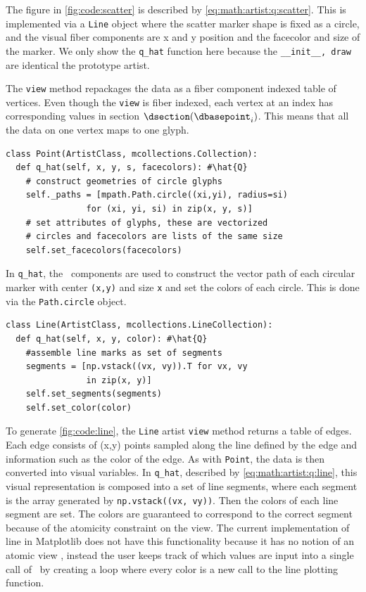 \documentclass[../main.tex]{subfiles}
\begin{document}
The figure in \autoref{fig:code:scatter} is described by \autoref{eq:math:artist:q:scatter}. This is implemented via a \texttt{Line} object where the scatter marker shape is fixed as a circle, and the visual fiber components are x and y position and the facecolor and size of the marker. We only show the \texttt{q_hat} function here because the \texttt{__init__, draw} are identical the prototype artist. 

The \texttt{view} method repackages the data as a fiber component indexed table of vertices. Even though the \texttt{view} is fiber indexed, each vertex at an index \dbasepoint has corresponding values in section $\dsection(\dbasepoint_{i})$. This means that all the data on one vertex maps to one glyph.
\begin{verbatim}
class Point(ArtistClass, mcollections.Collection):
  def q_hat(self, x, y, s, facecolors): #\hat{Q}
    # construct geometries of circle glyphs
    self._paths = [mpath.Path.circle((xi,yi), radius=si) 
                for (xi, yi, si) in zip(x, y, s)] 
    # set attributes of glyphs, these are vectorized 
    # circles and facecolors are lists of the same size
    self.set_facecolors(facecolors)
\end{verbatim} 
In \texttt{q_hat}, the \vsection\ components are used to construct the vector path of each circular marker with center \texttt{(x,y)} and size \texttt{x} and set the colors of each circle. This is done via the \texttt{Path.circle} object. 
\begin{verbatim}
class Line(ArtistClass, mcollections.LineCollection):
  def q_hat(self, x, y, color): #\hat{Q}
    #assemble line marks as set of segments 
    segments = [np.vstack((vx, vy)).T for vx, vy 
                in zip(x, y)]
    self.set_segments(segments)
    self.set_color(color)
\end{verbatim}
To generate \autoref{fig:code:line}, the \texttt{Line} artist \texttt{view} method returns a table of edges. Each edge consists of (x,y) points sampled along the line defined by the edge and information such as the color of the edge. As with \texttt{Point}, the data is then converted into visual variables. In \texttt{q_hat}, described by \autoref{eq:math:artist:q:line}, this visual representation is composed into a set of line segments, where each segment is the array generated by \texttt{np.vstack((vx, vy))}. Then the colors of each line segment are set. The colors are guaranteed to correspond to the correct segment because of the atomicity constraint on the view. The current implementation of line in Matplotlib does not have this functionality because it has no notion of an atomic view \dsection, instead the user keeps track of which values are input into a single call of \vmarkd\ by creating a loop where every color is a new call to the line plotting function. 
\end{document}
